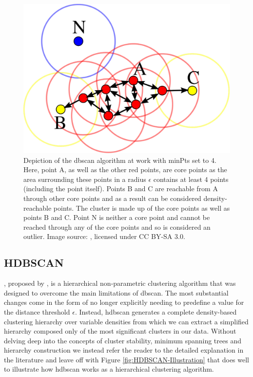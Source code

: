\begin{figure}[H]
    \centering
    \includegraphics[width=\textwidth]{Images/Chapter 3/DBSCAN/DBSCAN-Illustration.pdf}
    \caption{Depiction of the \gls{dbscan} algorithm at work with minPts set to 4. Here, point A, as well as the other red points, are core points as the area surrounding these points in a radius $\epsilon$ contains at least 4 points (including the point itself). Points B and C are reachable from A through other core points and as a result can be considered density-reachable points. The cluster is made up of the core points as well as points B and C. Point N is neither a core point and cannot be reached through any of the core points and so is considered an outlier. Image source: \cite{Wikipedia_DBSCAN}, licensed under CC BY-SA 3.0.}
    \label{fig:DBSCAN-Illustration}
\end{figure}

\subsection{HDBSCAN}
\label{subsec:Background-Information:Clustering-Algorithms:HDBSCAN}
, proposed by \citet{Campello}, is a hierarchical non-parametric clustering algorithm that was designed to overcome the main limitations of \gls{dbscan}. The most substantial changes come in the form of no longer explicitly needing to predefine a value for the distance threshold $\epsilon$. Instead, \gls{hdbscan} generates a complete density-based clustering hierarchy over variable densities from which we can extract a simplified hierarchy composed only of the most significant clusters in our data. Without delving deep into the concepts of cluster stability, minimum spanning trees and hierarchy construction we instead refer the reader to the detailed explanation in the literature \cite{Campello} and leave off with Figure \ref{fig:HDBSCAN-Illustration} that does well to illustrate how \gls{hdbscan} works as a hierarchical clustering algorithm.

